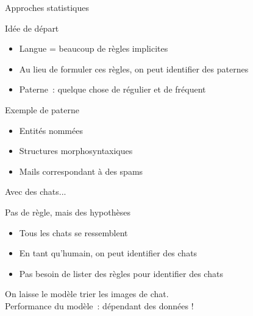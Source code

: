 \documentclass[serif, aspectratio=169]{beamer}
\begin{document}
\begin{frame}{Approches statistiques}
    \pause
    \begin{block}{Idée de départ}
        \begin{itemize}
            \item Langue = beaucoup de règles implicites
            \item Au lieu de formuler ces règles, on peut identifier des paternes
            \item Paterne~: quelque chose de régulier et de fréquent
        \end{itemize}
    \end{block}
    \vfill
    \pause
    \begin{block}{Exemple de paterne}
        \begin{itemize}
            \item Entités nommées
            \item Structures morphosyntaxiques
            \item Mails correspondant à des spams
        \end{itemize}
    \end{block}
\end{frame}


\begin{frame}{Avec des chats...}
    \pause
    \begin{block}{Pas de règle, mais des hypothèses}
        \begin{itemize}
            \item Tous les chats se ressemblent
            \item En tant qu'humain, on peut identifier des chats
            \item Pas besoin de lister des règles pour identifier des chats
        \end{itemize}
    \end{block}
    \vfill
    \pause
    \begin{center}
        \Large
        On laisse le modèle trier les images de chat. \\
        Performance du modèle~: dépendant des données !
    \end{center}
\end{frame}
\end{document}
